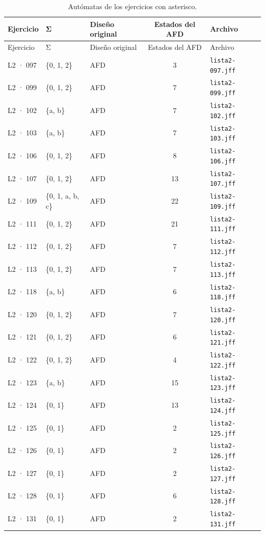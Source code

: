 \begin{longtable}[]{@{}lllcl@{}}
\caption{Autómatas de los ejercicios con asterisco.}\tabularnewline
\toprule\noalign{}
Ejercicio & Σ & Diseño original & Estados del AFD & Archivo \\
\midrule\noalign{}
\endfirsthead
\toprule\noalign{}
Ejercicio & Σ & Diseño original & Estados del AFD & Archivo \\
\midrule\noalign{}
\endhead
\bottomrule\noalign{}
\endlastfoot
L2 · 097 & \{0, 1, 2\} & AFD & 3 & \texttt{lista2-097.jff} \\
L2 · 099 & \{0, 1, 2\} & AFD & 7 & \texttt{lista2-099.jff} \\
L2 · 102 & \{a, b\} & AFD & 7 & \texttt{lista2-102.jff} \\
L2 · 103 & \{a, b\} & AFD & 7 & \texttt{lista2-103.jff} \\
L2 · 106 & \{0, 1, 2\} & AFD & 8 & \texttt{lista2-106.jff} \\
L2 · 107 & \{0, 1, 2\} & AFD & 13 & \texttt{lista2-107.jff} \\
L2 · 109 & \{0, 1, a, b, c\} & AFD & 22 & \texttt{lista2-109.jff} \\
L2 · 111 & \{0, 1, 2\} & AFD & 21 & \texttt{lista2-111.jff} \\
L2 · 112 & \{0, 1, 2\} & AFD & 7 & \texttt{lista2-112.jff} \\
L2 · 113 & \{0, 1, 2\} & AFD & 7 & \texttt{lista2-113.jff} \\
L2 · 118 & \{a, b\} & AFD & 6 & \texttt{lista2-118.jff} \\
L2 · 120 & \{0, 1, 2\} & AFD & 7 & \texttt{lista2-120.jff} \\
L2 · 121 & \{0, 1, 2\} & AFD & 6 & \texttt{lista2-121.jff} \\
L2 · 122 & \{0, 1, 2\} & AFD & 4 & \texttt{lista2-122.jff} \\
L2 · 123 & \{a, b\} & AFD & 15 & \texttt{lista2-123.jff} \\
L2 · 124 & \{0, 1\} & AFD & 13 & \texttt{lista2-124.jff} \\
L2 · 125 & \{0, 1\} & AFD & 2 & \texttt{lista2-125.jff} \\
L2 · 126 & \{0, 1\} & AFD & 2 & \texttt{lista2-126.jff} \\
L2 · 127 & \{0, 1\} & AFD & 2 & \texttt{lista2-127.jff} \\
L2 · 128 & \{0, 1\} & AFD & 6 & \texttt{lista2-128.jff} \\
L2 · 131 & \{0, 1\} & AFD & 2 & \texttt{lista2-131.jff} \\

\end{longtable}
